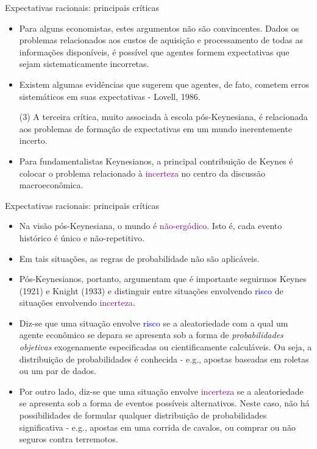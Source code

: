 \documentclass[10pt]{beamer}
\begin{document}
\begin{frame}{Expectativas racionais: principais críticas}
    \begin{itemize}
        \item Para alguns economistas, estes argumentos não são convincentes. Dados os problemas relacionados aos custos de aquisição e processamento de todas as informações disponíveis, é possível que agentes formem expectativas que sejam sistematicamente incorretas.
        \bigskip
        \item Existem algumas evidências que sugerem que agentes, de fato, cometem erros sistemáticos em suas expectativas - Lovell, 1986.
        \bigskip
        \item[(3)] A terceira crítica, muito associada à escola pós-Keynesiana, é relacionada aos problemas de formação de expectativas em um mundo inerentemente incerto.
        \bigskip
        \item Para fundamentalistas Keynesianos, a principal contribuição de Keynes é colocar o problema relacionado à \textcolor{purple}{incerteza} no centro da discussão macroeconômica.
    \end{itemize}
\end{frame}

\begin{frame}{Expectativas racionais: principais críticas}
    \begin{itemize}
        \item Na visão pós-Keynesiana, o mundo é \textcolor{purple}{não-ergódico}. Isto é, cada evento histórico é único e não-repetitivo.
        \bigskip
        \item Em tais situações, as regras de probabilidade não são aplicáveis.
        \bigskip
        \item Pós-Keynesianos, portanto, argumentam que é importante seguirmos Keynes (1921) e Knight (1933) e distinguir entre situações envolvendo \textcolor{blue}{risco} de situações envolvendo \textcolor{purple}{incerteza}.
        \bigskip
        \item Diz-se que uma situação envolve \textcolor{blue}{risco} se a aleatoriedade com a qual um agente econômico se depara se apresenta sob a forma de \emph{probabilidades objetivas} exogenamente especificadas ou cientificamente calculáveis. Ou seja, a distribuição de probabilidades é conhecida - e.g., apostas baseadas em roletas ou um par de dados.
        \bigskip
        \item Por outro lado, diz-se que uma situação envolve \textcolor{purple}{incerteza} se a aleatoriedade se apresenta sob a forma de eventos possíveis alternativos. Neste caso, não há possibilidades de formular qualquer distribuição de probabilidades significativa - e.g., apostas em uma corrida de cavalos, ou comprar ou não seguros contra terremotos.
    \end{itemize}
\end{frame}
\end{document}
